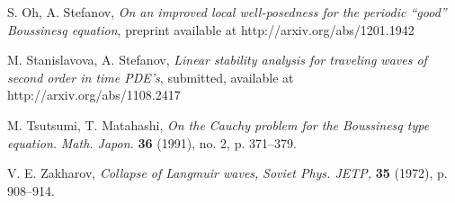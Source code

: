 \documentclass[final,11pt,leqno]{amsart}
\begin{document}
\begin{thebibliography}{100}
 S. Oh, A. Stefanov, \emph{On an improved local well-posedness   for the periodic ``good'' Boussinesq equation}, preprint available at http://arxiv.org/abs/1201.1942

 M. Stanislavova, A. Stefanov,
\emph{Linear stability analysis for traveling waves of second order in time PDE's}, submitted, available at http://arxiv.org/abs/1108.2417

 M. Tsutsumi, T. Matahashi, \emph{On the Cauchy problem for the Boussinesq type equation.} {\em Math. Japon.} {\bf 36} (1991), no. 2, p. 371--379.

 V. E. Zakharov, \emph{Collapse of Langmuir waves,} {\em Soviet Phys. JETP,} {\bf 35} (1972), p. 908--914.

\end{thebibliography}
\end{document}
